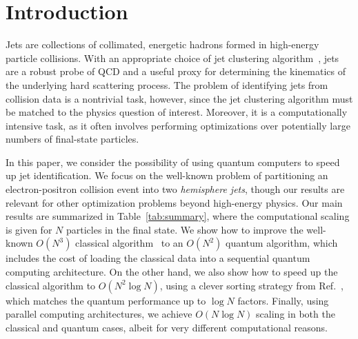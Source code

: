\documentclass[aps,prd,twocolumn,superscriptaddress,preprintnumbers,nofootinbib,longbibliography,floatfix]{revtex4-1}
\DeclareRobustCommand{\Tab}[1]{Table~\ref{#1}}
\DeclareRobustCommand{\Ref}[1]{Ref.~\cite{#1}}
\begin{document}
\maketitle

{\linespread{0.98} \footnotesize \tableofcontents}

%
%


%
%

\section{Introduction}
\label{sec:intro}

Jets are collections of collimated, energetic hadrons formed in high-energy particle collisions.
%
With an appropriate choice of jet clustering algorithm~\cite{Salam:2009jx}, jets are a robust probe of \ac{QCD} and a useful proxy for determining the kinematics of the underlying hard scattering process.
%
The problem of identifying jets from collision data is a nontrivial task, however, since the jet clustering algorithm must be matched to the physics question of interest.
%
Moreover, it is a computationally intensive task, as it often involves performing optimizations over potentially large numbers of final-state particles.


In this paper, we consider the possibility of using quantum computers to speed up jet identification.
%
We focus on the well-known problem of partitioning an electron-positron collision event into two \emph{hemisphere jets}, though our results are relevant for other optimization problems beyond high-energy physics.
%
Our main results are summarized in \Tab{tab:summary}, where the computational scaling is given for $N$ particles in the final state.
%
We show how to improve the well-known $O(N^3)$ classical algorithm~\cite{Yamamoto:1984fd} to an $O(N^2)$ quantum algorithm, which includes the cost of loading the classical data into a sequential quantum computing architecture.
%
On the other hand, we also show how to speed up the classical algorithm to $O(N^2 \log N)$, using a clever sorting strategy from \Ref{Salam:2007xv}, which matches the quantum performance up to $\log N$ factors.
%
Finally, using parallel computing architectures, we achieve $O(N \log N)$ scaling in both the classical and quantum cases, albeit for very different computational reasons.
\end{document}
